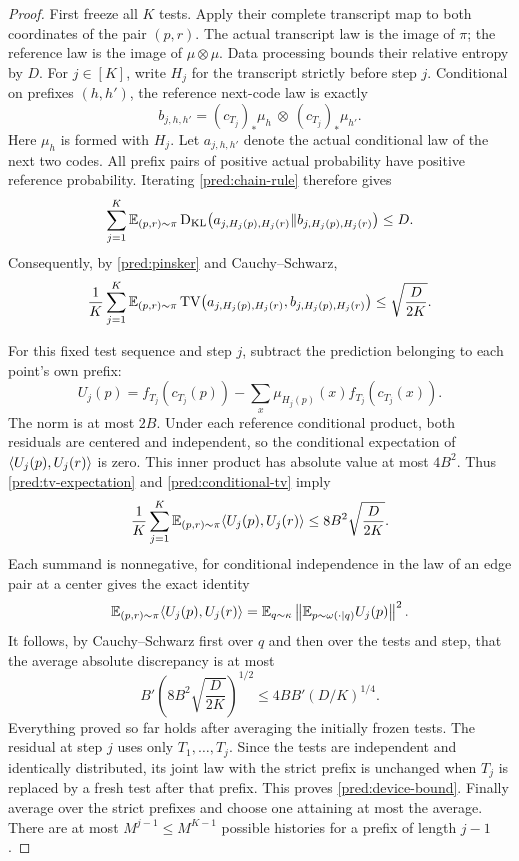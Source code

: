 \begin{proof}
First freeze all \(K\) tests.  Apply their complete transcript map to both
coordinates of the pair \((p,r)\).  The actual transcript law is the image of
\(\pi\); the reference law is the image of \(\mu\otimes\mu\).
Data processing bounds their relative entropy by \(D\).
For \(j\in[K]\), write \(H_j\) for the transcript strictly before step \(j\).
Conditional on prefixes \((h,h')\), the reference next-code law is exactly
\[
 b_{j,h,h'}=
 (c_{T_j})_*\mu_h\ \otimes\ (c_{T_j})_*\mu_{h'}.
\]
Here \(\mu_h\) is formed with \(H_j\).  Let \(a_{j,h,h'}\) denote the actual
conditional law of the next two codes.  All prefix pairs of positive actual
probability have positive reference probability.  Iterating
\eqref{pred:chain-rule} therefore gives
\begin{equation}\label{pred:conditional-kl}
 \sum_{j=1}^K
 \mathbb E_{(p,r)\sim\pi}
 \operatorname{D_{\mathrm{KL}}}\bigl(a_{j,H_j(p),H_j(r)}\Vert
          b_{j,H_j(p),H_j(r)}\bigr)\le D.
\end{equation}
Consequently, by \eqref{pred:pinsker} and Cauchy--Schwarz,
\begin{equation}\label{pred:conditional-tv}
 \frac1K\sum_{j=1}^K
 \mathbb E_{(p,r)\sim\pi}
 \operatorname{TV}\bigl(a_{j,H_j(p),H_j(r)},b_{j,H_j(p),H_j(r)}\bigr)
 \le\sqrt{\frac{D}{2K}}.
\end{equation}

For this fixed test sequence and step \(j\), subtract the prediction belonging
to each point's own prefix:
\[
 U_j(p)=f_{T_j}(c_{T_j}(p))-
            \sum_x\mu_{H_j(p)}(x)f_{T_j}(c_{T_j}(x)).
\]
The norm is at most \(2B\).  Under each reference conditional product, both
residuals are centered and independent, so the conditional expectation of
\(\langle U_j(p),U_j(r)\rangle\) is zero.  This inner product has absolute value at
most \(4B^2\).  Thus \eqref{pred:tv-expectation} and
\eqref{pred:conditional-tv} imply
\begin{equation}\label{pred:residual-variance}
 \frac1K\sum_{j=1}^K
 \mathbb E_{(p,r)\sim\pi}\langle U_j(p),U_j(r)\rangle
 \le8B^2\sqrt{\frac{D}{2K}}.
\end{equation}
Each summand is nonnegative, for conditional independence in the law of an edge pair at a center
gives the exact identity
\begin{equation}\label{pred:wedge-square}
 \mathbb E_{(p,r)\sim\pi}\langle U_j(p),U_j(r)\rangle
 =\mathbb E_{q\sim\kappa}
       \left\|\mathbb E_{p\sim\omega(\cdot\mid q)}U_j(p)\right\|^2.
\end{equation}
It follows, by Cauchy--Schwarz first over \(q\) and then over the tests and
step, that the average absolute discrepancy is at most
\[
 B'\left(8B^2\sqrt{\frac{D}{2K}}\right)^{1/2}
 \le4BB'(D/K)^{1/4}.
\]
Everything proved so far holds after averaging the initially frozen tests.
The residual at step \(j\) uses only \(T_1,\ldots,T_j\).  Since the tests
are independent and identically distributed, its joint law with the strict
prefix is unchanged when \(T_j\) is replaced by a fresh test after that
prefix.  This proves \eqref{pred:device-bound}.  Finally average over the
strict prefixes and choose one attaining at most the average.  There are at
most \(M^{j-1}\le M^{K-1}\) possible histories for a prefix of length \(j-1\).
\end{proof}

